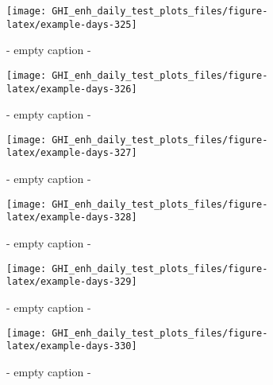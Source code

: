 \documentclass[
  10pt,
  a4paper,oneside]{article}
\begin{document}
\begin{figure}[H]

{\centering \texttt{[image: GHI\_enh\_daily\_test\_plots\_files/figure-latex/example-days-325]} 

}

\caption{ - empty caption - }\label{fig:example-days-325}
\end{figure}

\begin{figure}[H]

{\centering \texttt{[image: GHI\_enh\_daily\_test\_plots\_files/figure-latex/example-days-326]} 

}

\caption{ - empty caption - }\label{fig:example-days-326}
\end{figure}

\begin{figure}[H]

{\centering \texttt{[image: GHI\_enh\_daily\_test\_plots\_files/figure-latex/example-days-327]} 

}

\caption{ - empty caption - }\label{fig:example-days-327}
\end{figure}

\begin{figure}[H]

{\centering \texttt{[image: GHI\_enh\_daily\_test\_plots\_files/figure-latex/example-days-328]} 

}

\caption{ - empty caption - }\label{fig:example-days-328}
\end{figure}

\begin{figure}[H]

{\centering \texttt{[image: GHI\_enh\_daily\_test\_plots\_files/figure-latex/example-days-329]} 

}

\caption{ - empty caption - }\label{fig:example-days-329}
\end{figure}

\begin{figure}[H]

{\centering \texttt{[image: GHI\_enh\_daily\_test\_plots\_files/figure-latex/example-days-330]} 

}

\caption{ - empty caption - }\label{fig:example-days-330}
\end{figure}
\end{document}
